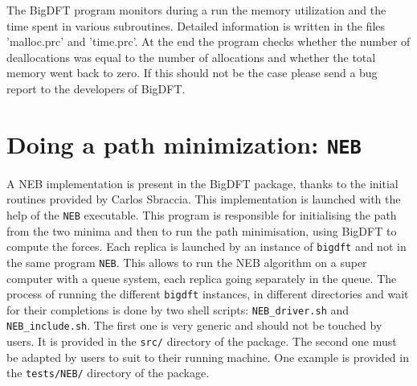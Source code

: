 \documentclass[a4paper,11pt]{report}
\begin{document}
\noindent
The BigDFT program monitors during a run the memory utilization and the time spent in various subroutines. Detailed information 
is written in the files 'malloc.prc' and 'time.prc'. At the end the program checks whether the number of deallocations was equal 
to the number of allocations and whether the total memory went back to zero. If this should not be the case please send a bug report to the developers of BigDFT.

\section{Doing a path minimization: \texttt{NEB}}
A NEB implementation is present in the BigDFT package, thanks to the initial routines provided by Carlos Sbraccia. This implementation is launched with the help of the \texttt{NEB} executable. This program is responsible for initialising the path from the two minima and then to run the path minimisation, using BigDFT to compute the forces. Each replica is launched by an instance of \texttt{bigdft} and not in the same program \texttt{NEB}. This allows to run the NEB algorithm on a super computer with a queue system, each replica going separately in the queue. 
The process of running the different \texttt{bigdft} instances, in different directories and wait for their completions is done by two shell scripts: \texttt{NEB\_driver.sh} and \texttt{NEB\_include.sh}. The first one is very generic and should not be touched by users. It is provided in the \texttt{src/} directory of the package. The second one must be adapted by users to suit to their running machine. One example is provided in the \texttt{tests/NEB/} directory of the package.
\end{document}
